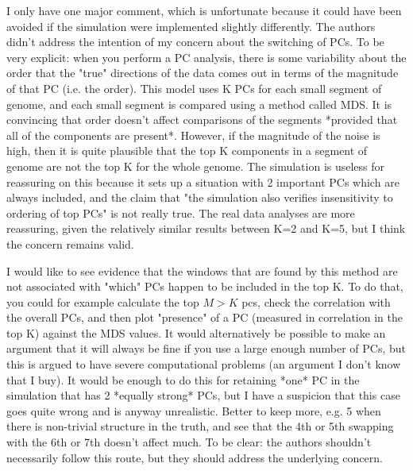 \begin{point}{}
I only have one major comment, which is unfortunate because it could have been avoided if the simulation were implemented slightly differently. The authors didn't address the intention of my concern about the switching of PCs. To be very explicit: when you perform a PC analysis, there is some variability about the order that the "true" directions of the data comes out in terms of the magnitude of that PC (i.e. the order). This model uses K PCs for each small segment of genome, and each small segment is compared using a method called MDS. It is convincing that order doesn't affect comparisons of the segments *provided that all of the components are present*. However, if the magnitude of the noise is high, then it is quite plausible that the top K components in a segment of genome are not the top K for the whole genome. The simulation is useless for reassuring on this because it sets up a situation with 2 important PCs which are always included, and the claim that "the simulation also verifies insensitivity to ordering of top PCs" is not really true. The real data analyses are more reassuring, given the relatively similar results between K=2 and K=5, but I think the concern remains valid.

I would like to see evidence that the windows that are found by this method are not associated with "which" PCs happen to be included in the top K. To do that, you could for example calculate the top $M>K$ pcs, check the correlation with the overall PCs, and then plot "presence" of a PC (measured in correlation in the top K) against the MDS values. It would alternatively be possible to make an argument that it will always be fine if you use a large enough number of PCs, but this is argued to have severe computational problems (an argument I don't know that I buy). It would be enough to do this for retaining *one* PC in the simulation that has 2 *equally strong* PCs, but I have a suspicion that this case goes quite wrong and is anyway unrealistic. Better to keep more, e.g. 5 when there is non-trivial structure in the truth, and see that the 4th or 5th swapping with the 6th or 7th doesn't affect much. To be clear: the authors shouldn't necessarily follow this route, but they should address the underlying concern.
\end{point}


